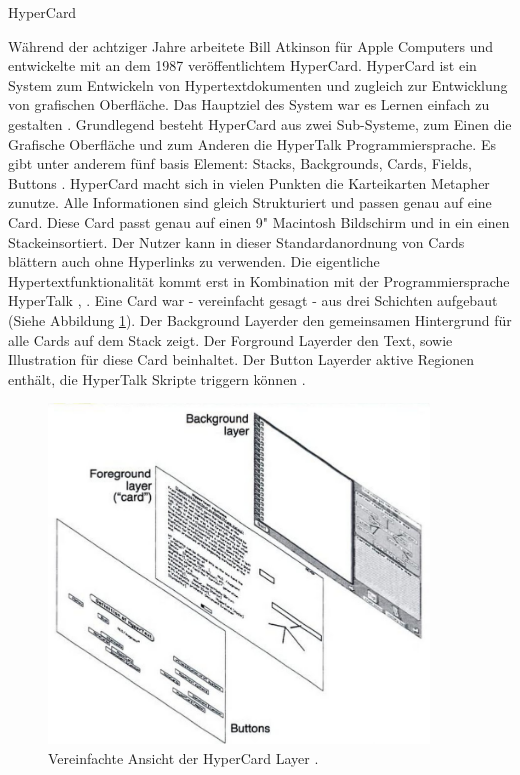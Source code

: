 \begin{section}{HyperCard}
\label{sec:hypercard}

Während der achtziger Jahre arbeitete Bill Atkinson für Apple Computers und entwickelte mit an dem 1987 veröffentlichtem HyperCard. HyperCard ist ein System zum Entwickeln von Hypertextdokumenten und zugleich zur Entwicklung von grafischen Oberfläche. Das Hauptziel des System war es Lernen einfach zu gestalten \cite{Nielsen1991}. Grundlegend besteht HyperCard aus zwei Sub-Systeme, zum Einen die Grafische Oberfläche und zum Anderen die HyperTalk Programmiersprache. Es gibt unter anderem fünf basis Element: Stacks, Backgrounds, Cards, Fields, Buttons \cite{Goodman1988}. HyperCard macht sich in vielen Punkten die Karteikarten Metapher zunutze. Alle Informationen sind gleich Strukturiert und passen genau auf eine \glqq Card\grqq{ }. Diese Card passt genau auf einen 9" Macintosh Bildschirm und in ein einen \glqq Stack\grqq{ }einsortiert. Der Nutzer kann in dieser Standardanordnung von Cards blättern auch ohne Hyperlinks zu verwenden. Die eigentliche Hypertextfunktionalität kommt erst in Kombination mit der Programmiersprache HyperTalk \cite{Goodman1988}, \cite{Nielsen1991}. Eine Card war - vereinfacht gesagt - aus drei Schichten aufgebaut (Siehe Abbildung \ref{fig:layer}). Der \glqq Background Layer\grqq{ }der den gemeinsamen Hintergrund für alle Cards auf dem Stack zeigt. Der \glqq Forground Layer\grqq{ }der den Text, sowie Illustration für diese Card beinhaltet. Der \glqq Button Layer\grqq{ }der aktive Regionen enthält, die HyperTalk Skripte triggern können \cite{Nielsen1995}.

\begin{figure}[H]
	\centering
	\includegraphics[width=0.9\textwidth]{image/layer}
	\caption{Vereinfachte Ansicht der HyperCard Layer \cite{Nielsen1995}.}
	\label{fig:layer}
\end{figure}


\end{section}
